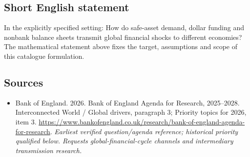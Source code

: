 \documentclass[11pt]{article}
\begin{document}
\subsection{Short English statement}
In the explicitly specified setting: How do safe-asset demand, dollar funding and nonbank balance sheets transmit global financial shocks to different economies? The mathematical statement above fixes the target, assumptions and scope of this catalogue formulation.

\subsection{Sources}
\begin{itemize}\raggedright
\item[\textnormal{[S1]}]\hypertarget{source:30007615:1}{} Bank of England. 2026. Bank of England Agenda for Research, 2025–2028. Interconnected World / Global drivers, paragraph 3; Priority topics for 2026, item 3.
\url{https://www.bankofengland.co.uk/research/bank-of-england-agenda-for-research}.
{\small\textit{Earliest verified question/agenda reference; historical priority qualified below. Requests global-financial-cycle channels and intermediary transmission research.}}
\end{itemize}
\end{document}
